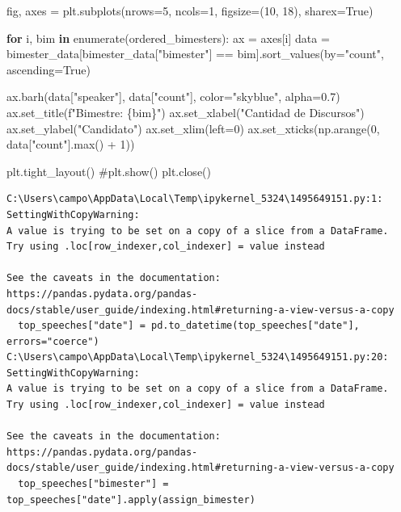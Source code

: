 \documentclass[
  letterpaper,
  DIV=11,
  numbers=noendperiod]{scrartcl}
\newenvironment{Shaded}{\begin{snugshade}}{\end{snugshade}}
\newcommand{\BuiltInTok}[1]{\textcolor[rgb]{0.00,0.23,0.31}{#1}}
\newcommand{\CommentTok}[1]{\textcolor[rgb]{0.37,0.37,0.37}{#1}}
\newcommand{\ControlFlowTok}[1]{\textcolor[rgb]{0.00,0.23,0.31}{\textbf{#1}}}
\newcommand{\DecValTok}[1]{\textcolor[rgb]{0.68,0.00,0.00}{#1}}
\newcommand{\FloatTok}[1]{\textcolor[rgb]{0.68,0.00,0.00}{#1}}
\newcommand{\KeywordTok}[1]{\textcolor[rgb]{0.00,0.23,0.31}{\textbf{#1}}}
\newcommand{\NormalTok}[1]{\textcolor[rgb]{0.00,0.23,0.31}{#1}}
\newcommand{\OperatorTok}[1]{\textcolor[rgb]{0.37,0.37,0.37}{#1}}
\newcommand{\SpecialCharTok}[1]{\textcolor[rgb]{0.37,0.37,0.37}{#1}}
\newcommand{\SpecialStringTok}[1]{\textcolor[rgb]{0.13,0.47,0.30}{#1}}
\newcommand{\StringTok}[1]{\textcolor[rgb]{0.13,0.47,0.30}{#1}}
\newcommand{\VariableTok}[1]{\textcolor[rgb]{0.07,0.07,0.07}{#1}}
\begin{document}
\begin{Shaded}
\begin{Highlighting}[]
\NormalTok{fig, axes }\OperatorTok{=}\NormalTok{ plt.subplots(nrows}\OperatorTok{=}\DecValTok{5}\NormalTok{, ncols}\OperatorTok{=}\DecValTok{1}\NormalTok{, figsize}\OperatorTok{=}\NormalTok{(}\DecValTok{10}\NormalTok{, }\DecValTok{18}\NormalTok{), sharex}\OperatorTok{=}\VariableTok{True}\NormalTok{)}

\ControlFlowTok{for}\NormalTok{ i, bim }\KeywordTok{in} \BuiltInTok{enumerate}\NormalTok{(ordered\_bimesters):}
\NormalTok{    ax }\OperatorTok{=}\NormalTok{ axes[i]}
\NormalTok{    data }\OperatorTok{=}\NormalTok{ bimester\_data[bimester\_data[}\StringTok{"bimester"}\NormalTok{] }\OperatorTok{==}\NormalTok{ bim].sort\_values(by}\OperatorTok{=}\StringTok{"count"}\NormalTok{, ascending}\OperatorTok{=}\VariableTok{True}\NormalTok{)}
    
\NormalTok{    ax.barh(data[}\StringTok{"speaker"}\NormalTok{], data[}\StringTok{"count"}\NormalTok{], color}\OperatorTok{=}\StringTok{"skyblue"}\NormalTok{, alpha}\OperatorTok{=}\FloatTok{0.7}\NormalTok{)}
\NormalTok{    ax.set\_title(}\SpecialStringTok{f"Bimestre: }\SpecialCharTok{\{}\NormalTok{bim}\SpecialCharTok{\}}\SpecialStringTok{"}\NormalTok{)}
\NormalTok{    ax.set\_xlabel(}\StringTok{"Cantidad de Discursos"}\NormalTok{)}
\NormalTok{    ax.set\_ylabel(}\StringTok{"Candidato"}\NormalTok{)}
\NormalTok{    ax.set\_xlim(left}\OperatorTok{=}\DecValTok{0}\NormalTok{)}
\NormalTok{    ax.set\_xticks(np.arange(}\DecValTok{0}\NormalTok{, data[}\StringTok{"count"}\NormalTok{].}\BuiltInTok{max}\NormalTok{() }\OperatorTok{+} \DecValTok{1}\NormalTok{))}

\NormalTok{plt.tight\_layout()}
\CommentTok{\#plt.show()}
\NormalTok{plt.close()}
\end{Highlighting}
\end{Shaded}

\begin{verbatim}
C:\Users\campo\AppData\Local\Temp\ipykernel_5324\1495649151.py:1: SettingWithCopyWarning: 
A value is trying to be set on a copy of a slice from a DataFrame.
Try using .loc[row_indexer,col_indexer] = value instead

See the caveats in the documentation: https://pandas.pydata.org/pandas-docs/stable/user_guide/indexing.html#returning-a-view-versus-a-copy
  top_speeches["date"] = pd.to_datetime(top_speeches["date"], errors="coerce")
C:\Users\campo\AppData\Local\Temp\ipykernel_5324\1495649151.py:20: SettingWithCopyWarning: 
A value is trying to be set on a copy of a slice from a DataFrame.
Try using .loc[row_indexer,col_indexer] = value instead

See the caveats in the documentation: https://pandas.pydata.org/pandas-docs/stable/user_guide/indexing.html#returning-a-view-versus-a-copy
  top_speeches["bimester"] = top_speeches["date"].apply(assign_bimester)
\end{verbatim}
\end{document}

